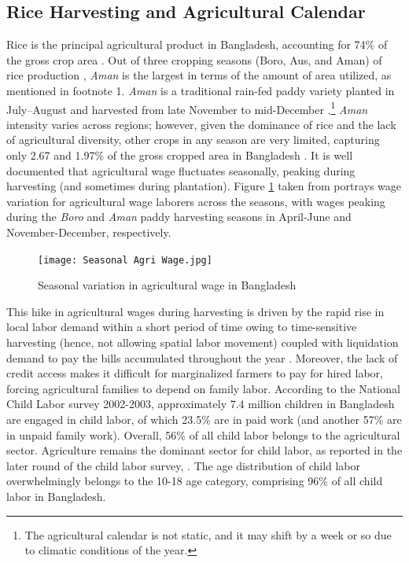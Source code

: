 \documentclass[12pt,letterpaper]{article}
\newcommand{\0}{\ensuremath{\mbox{\boldmath $0$}}}
\begin{document}
\subsection{Rice Harvesting and Agricultural Calendar \label{sec.rice}}

Rice is the principal agricultural product in Bangladesh, accounting for 74\% of the gross crop area \citep{tisdell2019agricultural}. Out of three cropping seasons (Boro, Aus, and Aman) of rice production \citep{laborte2017riceatlas}, \textit{Aman} is the largest in terms of the amount of area utilized, as mentioned in footnote 1. \textit{Aman} is a traditional rain-fed paddy variety planted in July–August and harvested from late November to mid-December \citep{shelley2016rice}.\footnote{The agricultural calendar is not static, and it may shift by a week or so due to climatic conditions of the year.} \textit{Aman} intensity varies across regions; however, given the dominance of rice and the lack of agricultural diversity, other crops in any season are very limited, capturing only 2.67 and 1.97\% of the gross cropped area in Bangladesh \citep{tisdell2019agricultural}. It is well documented that agricultural wage fluctuates seasonally, peaking during harvesting (and sometimes during plantation). Figure \ref{wage} taken from \citet{rahman1988labour} portrays wage variation for agricultural wage laborers across the seasons, with wages peaking during the \textit{Boro} and \textit{Aman} paddy harvesting seasons in April-June and November-December, respectively.

\begin{figure}[h!]
\centering
\texttt{[image: Seasonal Agri Wage.jpg]}\\
\caption{Seasonal variation in agricultural wage in Bangladesh}
\label{wage}
\end{figure}

This hike in agricultural wages during harvesting is driven by the rapid rise in local labor demand within a short period of time owing to time-sensitive harvesting (hence, not allowing spatial labor movement) coupled with liquidation demand to pay the bills accumulated throughout the year \citep{burke2019sell}. Moreover, the lack of credit access makes it difficult for marginalized farmers to pay for hired labor, forcing agricultural families to depend on family labor. According to the \cite{bbs2003report} National Child Labor survey 2002-2003, approximately 7.4 million children in Bangladesh are engaged in child labor, of which 23.5\% are in paid work (and another 57\% are in unpaid family work). Overall, 56\% of all child labor belongs to the agricultural sector. Agriculture remains the dominant sector for child labor, as reported in the later round of the child labor survey, \cite{bbs2013report}. The age distribution of child labor overwhelmingly belongs to the 10-18 age category, comprising 96\% of all child labor in Bangladesh.
\end{document}
